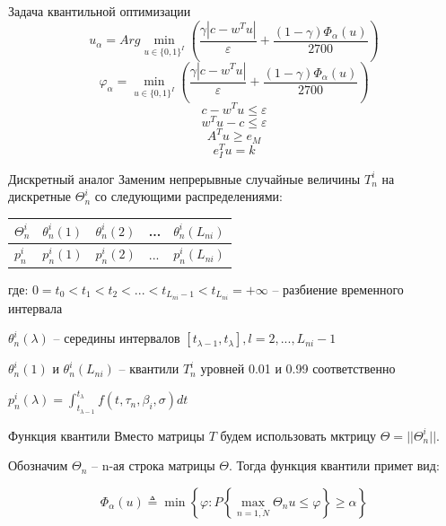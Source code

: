 \documentclass[aspectratio=169]{beamer}
\begin{document}
    \begin{frame}{Задача квантильной оптимизации}
        $$u_\alpha = Arg\min_{u\in\{0, 1\}^I}\left(\frac{\gamma\left|c-w^T u\right|}{\varepsilon} + \frac{(1-\gamma)\Phi_\alpha(u)}{2700}\right)$$
        $$\varphi_\alpha = \min_{u\in\{0, 1\}^I}\left(\frac{\gamma\left|c-w^T u\right|}{\varepsilon} + \frac{(1-\gamma)\Phi_\alpha(u)}{2700}\right)$$
        $$c-w^T u\leq\varepsilon$$
        $$w^T u-c\leq\varepsilon$$
        $$A^T u\geq e_M$$
        $$e_I^T u=k$$
    \end{frame}
    
    \begin{frame}{Дискретный аналог}
        Заменим непрерывные случайные величины $T_n^i$ на дискретные $\Theta_n^i$ со следующими распределениями:\\
        
        \begin{table}[]
            \begin{tabular}{|l||l|l|l|l|}
                \hline
                $\Theta_n^i$ & $\theta_n^i(1)$ & $\theta_n^i(2)$ & ... & $\theta_n^i(L_{ni})$\\ \hline
                $p_n^i$ & $p_n^i(1)$ & $p_n^i(2)$ & ... & $p_n^i(L_{ni})$\\ \hline
            \end{tabular}
        \end{table}
        
        где:\newline
        $0 = t_0 < t_1 < t_2 < ... < t_{L_{ni}-1} < t_{L_{ni}} = +\infty$ -- разбиение временного интервала\newline
        
        $\theta_n^i(\lambda)$ -- середины интервалов $[t_{\lambda-1}, t_\lambda], l=2,...,L_{ni}-1$\newline
        
        $\theta_n^i(1)$ и $\theta_n^i(L_{ni})$ -- квантили $T_n^i$ уровней 0.01 и 0.99 соответственно\newline
        
        $p_n^i(\lambda)=\int_{t_{\lambda-1}}^{t_\lambda}f(t, \tau_n, \beta_i, \sigma)dt$
    \end{frame}
    
    \begin{frame}{Функция квантили}
        Вместо матрицы $T$ будем использовать мктрицу $\Theta=||\Theta_n^i||$.
        
        Обозначим $\Theta_n$ -- n-ая строка матрицы $\Theta$. Тогда функция квантили примет вид:
        
        $$\Phi_\alpha(u)\triangleq\min\left\{\varphi:P\left\{\max_{n=\overline{1,N}}\Theta_n u\leq\varphi\right\}\geq\alpha\right\}$$
    \end{frame}
    
\end{document}
